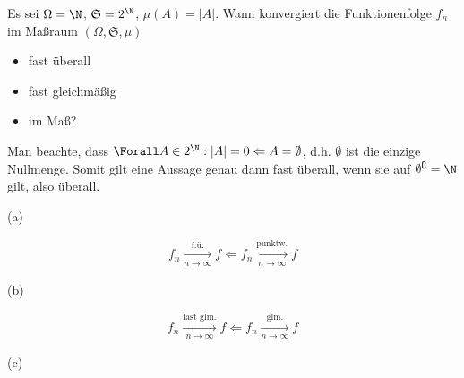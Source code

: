 \begin{exercise}

Es sei $\Omega = \N$, $\mathfrak{S} = 2^\N$, $\mu(A) = |A|$. Wann konvergiert die Funktionenfolge $f_n$ im Maßraum $(\Omega, \mathfrak{S}, \mu)$

\begin{itemize}
  \item[(a)] fast überall
  \item[(b)] fast gleichmäßig
  \item[(c)] im Maß?
\end{itemize}

\end{exercise}


\begin{solution}

Man beachte, dass $\Forall A \in 2^\N: |A| = 0 \Leftarrow A = \emptyset$, d.h. $\emptyset$ ist die einzige Nullmenge. Somit gilt eine Aussage genau dann fast überall, wenn sie auf $\emptyset^\complement = \N$ gilt, also überall.

(a)

\begin{align*}
  f_n \xrightarrow[n \to \infty]{\text{f.ü.}} f
  \Leftarrow
  f_n \xrightarrow[n \to \infty]{\text{punktw.}} f
\end{align*}

(b)

\begin{align*}
  f_n \xrightarrow[n \to \infty]{\text{fast glm.}} f
  \Leftarrow
  f_n \xrightarrow[n \to \infty]{\text{glm.}} f
\end{align*}

(c)

\end{solution}
